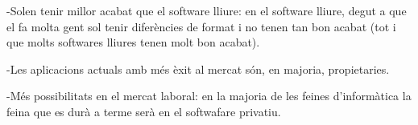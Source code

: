 -Solen tenir millor acabat que el software lliure: en el software lliure, degut a que
 el fa molta gent sol tenir diferències de format i no tenen tan bon acabat (tot i que
 molts softwares lliures tenen molt bon acabat).

-Les aplicacions actuals amb més èxit al mercat són, en majoria, propietaries.

-Més possibilitats en el mercat laboral: en la majoria de les feines d'informàtica la
feina que es durà a terme serà en el softwafare privatiu.
\cite{gentegeek}








